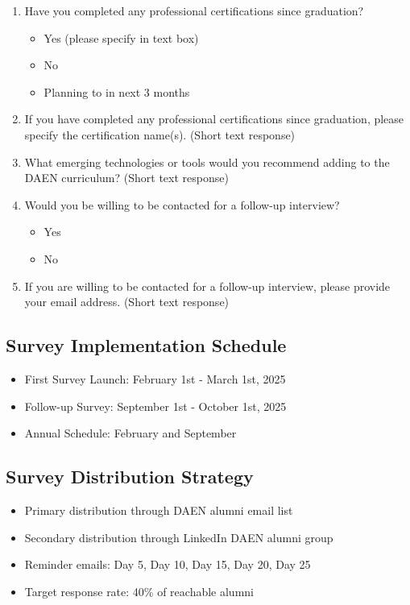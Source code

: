 \documentclass[12pt,a4paper]{article}
\begin{document}
\begin{enumerate}
\item Have you completed any professional certifications since graduation?
\begin{itemize}
    \item Yes (please specify in text box)
    \item No
    \item Planning to in next 3 months
\end{itemize}

\item If you have completed any professional certifications since graduation, please specify the certification name(s). (Short text response)

\item What emerging technologies or tools would you recommend adding to the DAEN curriculum? (Short text response)

\item Would you be willing to be contacted for a follow-up interview?
\begin{itemize}
    \item Yes
    \item No
\end{itemize}

\item If you are willing to be contacted for a follow-up interview, please provide your email address. (Short text response)
\end{enumerate}

\subsection{Survey Implementation Schedule}
\begin{itemize}
    \item First Survey Launch: February 1st - March 1st, 2025
    \item Follow-up Survey: September 1st - October 1st, 2025
    \item Annual Schedule: February and September
\end{itemize}

\subsection{Survey Distribution Strategy}
\begin{itemize}
    \item Primary distribution through DAEN alumni email list
    \item Secondary distribution through LinkedIn DAEN alumni group
    \item Reminder emails: Day 5, Day 10, Day 15, Day 20, Day 25
    \item Target response rate: 40\% of reachable alumni
\end{itemize}
\end{document}

